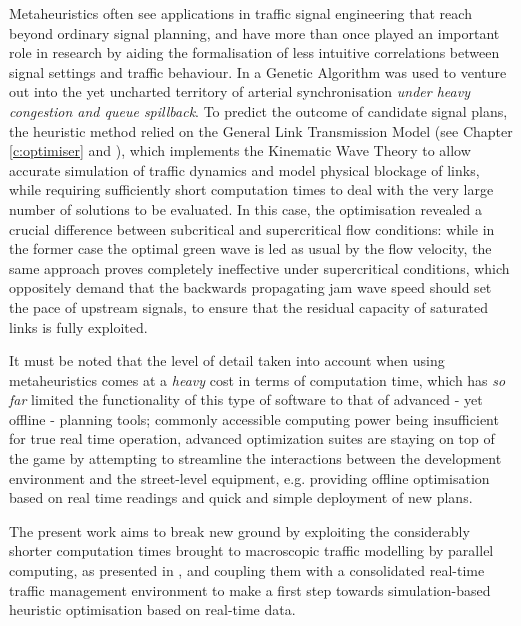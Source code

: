 Metaheuristics often see applications in traffic signal engineering that reach beyond ordinary signal planning, and have more than once played an important role in research by aiding the formalisation of less intuitive correlations between signal settings and traffic behaviour. In \citep{gentile2009synchronization} a Genetic Algorithm was used to venture out into the yet uncharted territory of arterial synchronisation \emph{under heavy congestion and queue spillback}. To predict the outcome of candidate signal plans, the heuristic method relied on the General Link Transmission Model (see Chapter \ref{c:optimiser} and \cite{gentile2010general}), which implements the Kinematic Wave Theory to allow accurate simulation of traffic dynamics and model physical blockage of links, while requiring sufficiently short computation times to deal with the very large number of solutions to be evaluated.
In this case, the optimisation revealed a crucial difference between subcritical and supercritical flow conditions: while in the former case the optimal green wave is led as usual by the flow velocity, the same approach proves completely ineffective under supercritical conditions, which oppositely demand that the backwards propagating jam wave speed should set the pace of upstream signals, to ensure that the residual capacity of saturated links is fully exploited.

It must be noted that the level of detail taken into account when using metaheuristics comes at a \emph{heavy} cost in terms of computation time, which has \emph{so far} limited the functionality of this type of software to that of advanced - yet offline - planning tools; commonly accessible computing power being insufficient for true real time operation, advanced optimization suites are staying on top of the game by attempting to streamline the interactions between the development environment and the street-level equipment, e.g. providing offline optimisation based on real time readings and quick and simple deployment of new plans.

The present work aims to break new ground by exploiting the considerably shorter computation times brought to macroscopic traffic modelling by parallel computing, as presented in \citep{attanasi2015real}, and coupling them with a consolidated real-time traffic management environment to make a first step towards simulation-based heuristic optimisation based on real-time data. 

















